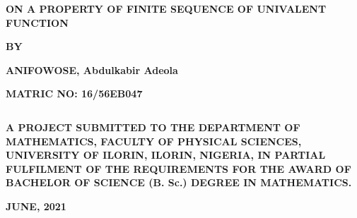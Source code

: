 \documentclass[a4paper, 12pt]{report}
\begin{document}
\tableofcontents
\newcommand{\np}{\newpage}
\begin{titlepage}
		\begin{center} 
		\textbf{\Large ON A PROPERTY OF FINITE SEQUENCE OF UNIVALENT FUNCTION} 
		\end{center}
			\begin{center}	                    \textbf{\emph\large BY}		                               \end{center}
\begin{center}    				
\textbf{\large ANIFOWOSE, Abdulkabir Adeola}               \end{center}
			\begin{center} 		           \textbf{\upshape MATRIC NO: 16/56EB047}															             \end{center}
$$$$%
			\begin{center}      \textbf{A PROJECT SUBMITTED TO THE DEPARTMENT OF MATHEMATICS, FACULTY OF PHYSICAL SCIENCES, UNIVERSITY OF ILORIN, ILORIN, NIGERIA, IN PARTIAL FULFILMENT OF THE  REQUIREMENTS FOR THE AWARD OF BACHELOR OF SCIENCE (B. Sc.) DEGREE IN MATHEMATICS.}
		\end{center}
		
		
		
\begin{center}       
\vspace{2in}\textbf{JUNE, 2021}
\end{center}						 
\end{titlepage}
 \np
\end{document}
